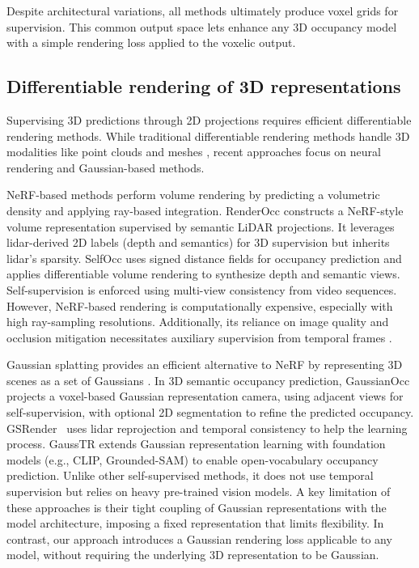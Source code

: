 

Despite architectural variations, all methods ultimately produce voxel grids for supervision. This common 
output space lets \method{} enhance any 3D occupancy model with a simple rendering loss applied to the voxelic output.






\subsection{Differentiable rendering of 3D representations}

Supervising 3D predictions through 2D projections requires efficient differentiable rendering methods.
While traditional differentiable rendering methods handle 3D modalities like point clouds and meshes \cite{kato2018meshrenderer, miu2018paparazzi}, recent approaches focus on neural rendering and Gaussian-based methods.

NeRF-based methods \cite{mildenhall2020NeRF} perform volume rendering by predicting a volumetric density and applying ray-based integration. RenderOcc \cite{pan2024renderocc} constructs a NeRF-style volume representation supervised by semantic LiDAR projections. It leverages lidar-derived 2D labels (depth and semantics) for 3D supervision but inherits lidar's sparsity.
SelfOcc \cite{huang2024selfocc} uses signed distance fields for occupancy prediction and applies differentiable volume rendering to synthesize depth and semantic views. Self-supervision is enforced using multi-view consistency from video sequences.
However, NeRF-based rendering is computationally expensive, especially with high ray-sampling resolutions. Additionally, its reliance on image quality and occlusion mitigation necessitates auxiliary supervision from temporal frames \citep{sun2024gsrender,pan2024renderocc}.

Gaussian splatting provides an efficient alternative to NeRF by representing 3D scenes as a set of Gaussians \citep{kerbl3Dgaussians}. In 3D semantic occupancy prediction, GaussianOcc \cite{gan2024gaussianocc} projects a voxel-based Gaussian representation camera, using adjacent views for self-supervision, with optional 2D segmentation to refine the predicted occupancy.
{GSRender~\cite{sun2024gsrender} uses lidar reprojection and temporal consistency to help the learning process.}
GaussTR \cite{jiang2024gausstr} extends Gaussian representation learning with foundation models (e.g., CLIP, Grounded-SAM) to enable open-vocabulary occupancy prediction. Unlike other self-supervised methods, it does not use temporal supervision but relies on heavy pre-trained vision models.
A key limitation of these approaches is their tight coupling of Gaussian representations with the model architecture, imposing a fixed representation that limits flexibility. 
In contrast, our approach introduces a Gaussian rendering loss applicable to any model, without requiring the underlying 3D representation to be Gaussian.



